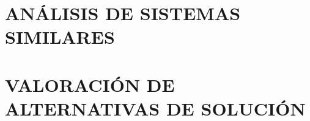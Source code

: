 \section{ANÁLISIS DE SISTEMAS SIMILARES}



\newpage
\section{VALORACIÓN DE ALTERNATIVAS DE SOLUCIÓN} \label{sec:3_2-Alternativas-solucion}
\hypertarget{sec:3_2-Alternativas-solucion}{}
